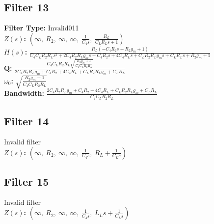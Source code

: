 \documentclass{article}
\begin{document}
\subsection*{Filter 13}
\textbf{Filter Type:} Invalid011 \\ 
\textbf{$Z(s)$:} $\left( \infty, \  R_{2}, \  \infty, \  \infty, \  \frac{1}{C_{4} s}, \  \frac{R_{L}}{C_{L} R_{L} s + 1}\right)$ \\ 
\textbf{$H(s)$:} $\frac{R_{L} \left(- C_{4} R_{2} s + R_{2} g_{m} + 1\right)}{C_{4} C_{L} R_{2} R_{L} s^{2} + 2 C_{4} R_{2} R_{L} g_{m} s + C_{4} R_{2} s + 4 C_{4} R_{L} s + C_{L} R_{2} R_{L} g_{m} s + C_{L} R_{L} s + R_{2} g_{m} + 1}$ \\ 
\textbf{Q:} $\frac{C_{4} C_{L} R_{2} R_{L} \sqrt{\frac{R_{2} g_{m} + 1}{C_{4} C_{L} R_{2} R_{L}}}}{2 C_{4} R_{2} R_{L} g_{m} + C_{4} R_{2} + 4 C_{4} R_{L} + C_{L} R_{2} R_{L} g_{m} + C_{L} R_{L}}$ \\ 
\textbf{$\omega_0$:} $\sqrt{\frac{R_{2} g_{m} + 1}{C_{4} C_{L} R_{2} R_{L}}}$ \\ 
\textbf{Bandwidth:} $\frac{2 C_{4} R_{2} R_{L} g_{m} + C_{4} R_{2} + 4 C_{4} R_{L} + C_{L} R_{2} R_{L} g_{m} + C_{L} R_{L}}{C_{4} C_{L} R_{2} R_{L}}$ \\ 
\subsection*{Filter 14}
Invalid filter \\ 
\textbf{$Z(s)$:} $\left( \infty, \  R_{2}, \  \infty, \  \infty, \  \frac{1}{C_{4} s}, \  R_{L} + \frac{1}{C_{L} s}\right)$ \\ 
\subsection*{Filter 15}
Invalid filter \\ 
\textbf{$Z(s)$:} $\left( \infty, \  R_{2}, \  \infty, \  \infty, \  \frac{1}{C_{4} s}, \  L_{L} s + \frac{1}{C_{L} s}\right)$ \\ 
\end{document}
